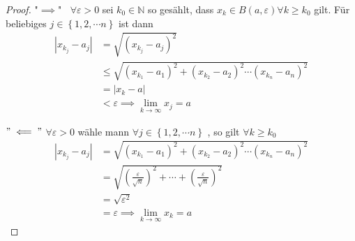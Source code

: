 \documentclass[a4paper]{memoir}
\begin{document}
\begin{proof}
	"$ \implies $" $\;\; \forall \varepsilon >0  $ sei $ k_0 \in \mathbb{N} $ so gesählt, dass $ x_{k} \in B(a, \varepsilon) \forall k \geq k_0$
	gilt. Für beliebiges $ j \in \left\{ 1, 2, \cdots n \right\}  $ ist dann
	\begin{align*}
		\left| x_{k_{j}} - a_{j} \right| &= \sqrt{\left( x_{k_{j}} - a_{j} \right)^2}\\ 
		& \leq	\sqrt{ \left(  x_{k_{1}} - a _{1} \right)^2 +  \left(  x_{k_{2}} - a _{2}\right)^2 \cdots \left(  x_{k_{n}} - a _{n}\right)^2} \\ 
		& = \left| x_{k} -a \right| \\
		 & < \varepsilon \implies \lim_{ k \to \infty} x_{j} = a  
	\end{align*}
	
$"\impliedby"$ $ \forall \varepsilon > 0 $ wähle mann $ \forall j \in \left\{  1,2, \cdots n \right\}$ , so gilt $ \forall k \geq k_0$
\begin{align*}
	 \left| x_{k_{j}} - a_{j} \right| &= \sqrt{ \left(  x_{k_{1}} - a _{1} \right)^2 +  \left(  x_{k_{2}} - a _{2}\right)^2 \cdots 
\left(  x_{k_{n}} - a _{n}\right)^2} \\
&= \sqrt{\left( \frac{ \varepsilon}{\sqrt{n}} \right)^2 + \cdots +  \left( \frac{ \varepsilon}{\sqrt{n}} \right)^2}\\
& = \sqrt{ \varepsilon^2}\\
&= \varepsilon \implies \lim_{k \to \infty} x_{k} = a  
\end{align*}

 
\end{proof}
	
\end{document}
